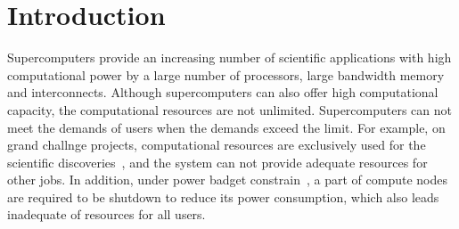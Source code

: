 \section{Introduction}
\label{sec:introduction}
Supercomputers provide an increasing number of scientific applications with high computational power by a large number of processors, large bandwidth memory and interconnects.
Although supercomputers can also offer high computational capacity, the computational resources are not unlimited. 
Supercomputers can not meet the demands of users when the demands exceed the limit. 
For example, on grand challnge projects, computational resources are exclusively used for the scientific discoveries~\cite{Scientific_Grand_Challenges_Crosscutting_Technologies_for_Computing_at_the_Exascale, Scientific_Grand_Challenges_in_National_Security_the_Role_of_Computing_at_the_Extreme_Scale}, and the system can not provide adequate resources for other jobs.
In addition, under power badget constrain~\cite{Exploring_Hardware_Overprovisioning_in_Power-constrained_High_Performance_Computing,Operation_of_TSUBAME_2_0_Green_Supercomputer_dealing_with_Power_Crisis}, a part of compute nodes are required to be shutdown to reduce its power consumption, which also leads inadequate of resources for all users. 

